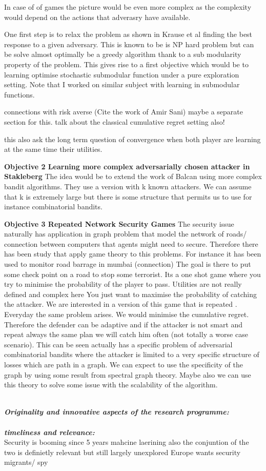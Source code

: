 In case of of games the picture would be even more complex as the complexity would depend on the actions that adverasry have available.

One first step is to relax the problem as shown in Krause et al finding the best response to a given adversary. This is known to be is NP hard problem  but can be solve almost optimally be a greedy algorithm thank to a sub modularity property of the problem. This gives rise to a first objective which would be to learning optimise stochastic submodular function under a pure exploration setting.
Note that I worked on similar subject with learning in submodular functions.

connections with risk averse (Cite the work of Amir Sani) maybe a separate section for this.
talk about the classical cumulative regret setting also!

this also ask the long term question of convergence when both player are learning at the same time their utilities.

\textbf{Objective 2 Learning  more complex adversarially chosen attacker in  Stakleberg}
The idea would be to  extend the work of Balcan using more complex bandit algorithms. They use a version with k known attackers. We can assume that k is extremely large but there is some  structure that permits us to use for instance combinatorial bandits.



\textbf{Objective 3 Repeated Network Security Games}
The security issue naturally has application in graph problem that model the network of roads/ connection between computers that agents might need to secure. Therefore there has been study that apply game theory to this problems. For instance it has been used to monitor road barrage in mumbai (connection) The goal is there to put some check point on a road to stop some terrorist. Its a one shot game where you try to minimise the probability of the player to pass.  Utilities are not really defined and complex here You just want to maximise the probability of catching the attacker. We are interested in a version of this game that is repeated . Everyday the same problem arises. We would minimise the cumulative regret. Therefore the defender can be adaptive and if the attacker is not smart and repeat always the same plan we will catch him often (not totally a worse case scenario). This can be seen actually has a specific problem of adversarial combinatorial bandits where the  attacker is limited to a very specific structure of losses which are path in a graph. We can expect to use the specificity of the graph by using some result from spectral graph theory. Maybe also we can use this theory to solve some issue with the scalability of the algorithm.



\noindent \textbf{\textit{\\Originality and innovative aspects of the research programme:}}\\

 
\noindent \textbf{\textit{\\timeliness and relevance:}}\\
Security is booming since 5 years
mahcine laerining also
the conjuntion of the two is definietly relevant but still largely unexplored
Europe wants security
migrants/ spy
 